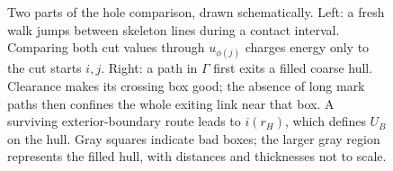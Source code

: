 \begin{figure}[t]
\caption{Two parts of the hole comparison, drawn schematically.
Left: a fresh walk jumps between skeleton lines during a contact
interval.  Comparing both cut values through $u_{\phi(j)}$ charges
energy only to the cut starts $i,j$.
Right: a path in $\Gamma$ first exits a filled coarse hull.
Clearance makes its crossing box good; the absence of long mark paths
then confines the whole exiting link near that box.  A surviving
exterior-boundary route leads to $i(r_H)$, which defines $U_B$ on
the hull.  Gray squares indicate bad boxes; the larger gray region
represents the filled hull, with distances and thicknesses not to scale.}
\label{fig:holes-comparison}
\end{figure}
